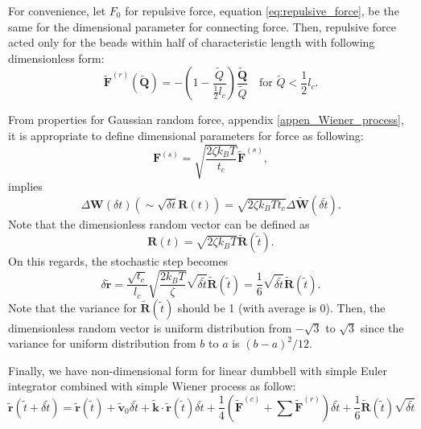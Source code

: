 \documentclass[10pt, a4paper]{article}
\begin{document}
For convenience, let $F_0$ for repulsive force, equation \eqref{eq:repulsive_force}, be the same for the dimensional parameter for connecting force. Then, repulsive force acted only for the beads within half of characteristic length with following dimensionless form:
\begin{equation}
  \tilde{\mathbf{F}}^{(r)}(\tilde{\mathbf{Q}}) = - \left(1 - \frac{\tilde{Q}}{\frac{1}{2}l_c}\right)\frac{\tilde{\mathbf{Q}}}{\tilde{Q}}\quad\textrm{for }\tilde{Q}<\frac{1}{2}l_c.
\end{equation}

From properties for Gaussian random force, appendix \ref{appen_Wiener_process}, it is appropriate to define dimensional parameters for force as following:
\begin{equation}
\mathbf{F}^{(s)} = \sqrt{\frac{2\zeta k_BT}{t_c}}\tilde{\mathbf{F}}^{(s)},
\end{equation}
implies
\begin{equation}
\Delta \mathbf{W}(\delta t) \left(\sim \sqrt{\delta t}\mathbf{R}(t)\right)= \sqrt{2\zeta k_BT t_c}\Delta\tilde{\mathbf{W}}(\delta \tilde{t}).
\end{equation}
Note that the dimensionless random vector can be defined as 
\begin{equation}
\mathbf{R}(t) = \sqrt{2\zeta k_BT}\tilde{\mathbf{R}}(\tilde{t}).
\end{equation}
On this regards, the stochastic step becomes
\begin{equation}
\delta\tilde{\mathbf{r}} = \frac{\sqrt{t_c}}{l_c}\sqrt{\frac{2k_BT }{\zeta}}\sqrt{\delta\tilde{t}}\tilde{\mathbf{R}}(\tilde{t}) = \frac{1}{6}\sqrt{\delta \tilde{t}}\tilde{\mathbf{R}}(\tilde{t}).
\end{equation}
Note that the variance for $\tilde{\mathbf{R}}(\tilde{t})$ should be 1 (with average is 0). Then, the dimensionless random vector is uniform distribution from $-\sqrt{3}$ to $\sqrt{3}$ since the variance for uniform distribution from $b$ to $a$ is $(b-a)^2/12$.

Finally, we have non-dimensional form for linear dumbbell with simple Euler integrator combined with simple Wiener process as follow:
\begin{equation}
\tilde{\mathbf{r}}(\tilde{t} + \delta \tilde{t}) = \tilde{\mathbf{r}}(\tilde{t}) + \tilde{\mathbf{v}}_0\delta \tilde{t} + \tilde{\mathbf{k}}\cdot\tilde{\mathbf{r}}(\tilde{t}) \delta \tilde{t} + \frac{1}{4}\left(\tilde{\mathbf{F}}^{(c)} + \sum\tilde{\mathbf{F}}^{(r)}\right)\delta\tilde{t} + \frac{1}{6}\tilde{\mathbf{R}}(\tilde{t})\sqrt{\delta\tilde{t}}\label{eq:dimensionless_update_position}
\end{equation}
\end{document}
